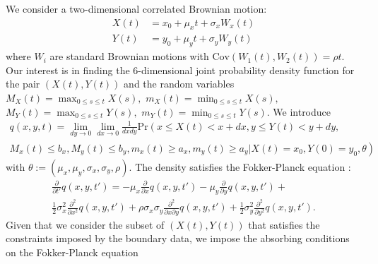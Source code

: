 We consider a two-dimensional correlated Brownian motion:
\begin{align}
  X(t) &= x_0 + \mu_x t + \sigma_x W_x(t)  \label{eq:X} \\
  Y(t) &= y_0 + \mu_y t + \sigma_y W_y(t)  \label{eq:Y}
\end{align}
where $W_i$ are standard Brownian motions with
$\mbox{Cov}(W_1(t), W_2(t)) = \rho t$. Our interest is in finding the
6-dimensional joint probability density function for the pair $(X(t), Y(t))$
and the random variables $M_X(t)=\max_{0\leq s\leq t}X(s),$
$m_X(t)=\min_{0\leq s\leq t}X(s),$ $M_Y(t)=\max_{0\leq s\leq t}Y(s),$
$m_Y(t)=\min_{0\leq s\leq t}Y(s)$. We introduce
\begin{multline}
  q(x,y,t) = \lim_{dy \to 0} \lim_{dx \to 0} \frac{1}{dx dy} \mbox{Pr}\left(x \leq X(t) < x+dx, y \leq Y(t) < y+dy, \right. \\
  \left. M_x(t) \leq b_x, M_y(t) \leq b_y, m_x(t) \geq a_x, m_y(t) \geq a_y | X(t) = x_0, Y(0) = y_0,
  \theta \right) \label{eq:CDF}
\end{multline}
with $\theta := (\mu_x, \mu_y, \sigma_x, \sigma_y, \rho).$ %
The density satisfies the Fokker-Planck equation
\cite{oksendal2013stochastic}:
\begin{multline}
  \displaystyle \frac{\partial}{\partial t'} q(x,y,t') = -\mu_x \frac{\partial}{\partial x}q(x,y,t')
  - \mu_y \frac{\partial}{\partial y}q(x,y,t') + \\
  \frac{1}{2}\sigma_x^2 \frac{\partial^2}{\partial x^2}q(x,y,t') + \rho\sigma_x\sigma_y \frac{\partial^2}{\partial x \partial y}q(x,y,t')
  + \frac{1}{2}\sigma_y^2 \frac{\partial^2}{\partial y^2}q(x,y,t'). \label{eq:1}
\end{multline}
Given that we consider the subset of $(X(t), Y(t))$ that satisfies the constraints imposed by the boundary data, we impose the absorbing conditions on the Fokker-Planck equation
